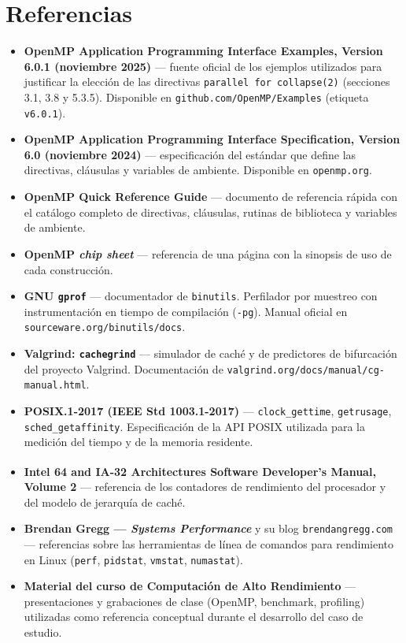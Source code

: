 \section{Referencias}

\begin{itemize}
    \item \textbf{OpenMP Application Programming Interface Examples, Version 6.0.1 (noviembre 2025)} --- fuente oficial de los ejemplos utilizados para justificar la elección de las directivas \texttt{parallel for collapse(2)} (secciones 3.1, 3.8 y 5.3.5). Disponible en \texttt{github.com/OpenMP/Examples} (etiqueta \texttt{v6.0.1}).

    \item \textbf{OpenMP Application Programming Interface Specification, Version 6.0 (noviembre 2024)} --- especificación del estándar que define las directivas, cláusulas y variables de ambiente. Disponible en \texttt{openmp.org}.

    \item \textbf{OpenMP Quick Reference Guide} --- documento de referencia rápida con el catálogo completo de directivas, cláusulas, rutinas de biblioteca y variables de ambiente.

    \item \textbf{OpenMP \emph{chip sheet}} --- referencia de una página con la sinopsis de uso de cada construcción.

    \item \textbf{GNU \texttt{gprof}} --- documentador de \texttt{binutils}. Perfilador por muestreo con instrumentación en tiempo de compilación (\texttt{-pg}). Manual oficial en \texttt{sourceware.org/binutils/docs}.

    \item \textbf{Valgrind: \texttt{cachegrind}} --- simulador de caché y de predictores de bifurcación del proyecto Valgrind. Documentación de \texttt{valgrind.org/docs/manual/cg-manual.html}.

    \item \textbf{POSIX.1-2017 (IEEE Std 1003.1-2017)} --- \texttt{clock\_gettime}, \texttt{getrusage}, \texttt{sched\_getaffinity}. Especificación de la API POSIX utilizada para la medición del tiempo y de la memoria residente.

    \item \textbf{Intel\textsuperscript{\textregistered} 64 and IA-32 Architectures Software Developer's Manual, Volume 2} --- referencia de los contadores de rendimiento del procesador y del modelo de jerarquía de caché.

    \item \textbf{Brendan Gregg --- \textit{Systems Performance}} y su blog \texttt{brendangregg.com} --- referencias sobre las herramientas de línea de comandos para rendimiento en Linux (\texttt{perf}, \texttt{pidstat}, \texttt{vmstat}, \texttt{numastat}).

    \item \textbf{Material del curso de Computación de Alto Rendimiento} --- presentaciones y grabaciones de clase (OpenMP, benchmark, profiling) utilizadas como referencia conceptual durante el desarrollo del caso de estudio.
\end{itemize}

